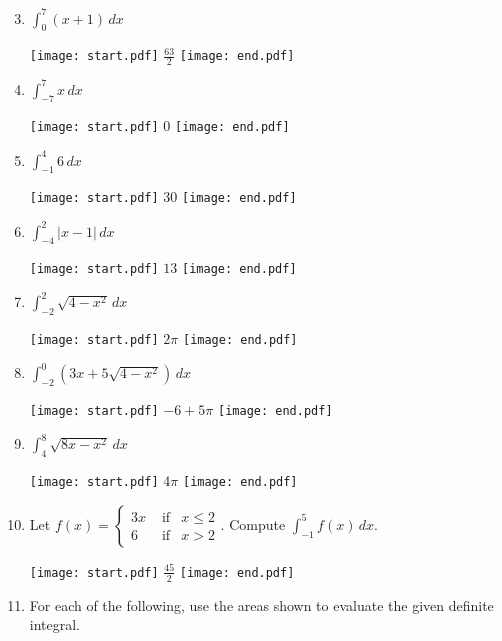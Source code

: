 \documentclass[12pt]{article}
\begin{document}

\begin{enumerate}
\setcounter{enumi}{2}

\item $\int_0^7{(x+1)}\,dx$

\texttt{[image: start.pdf]}
{{$\frac{63}{2}$}}
\texttt{[image: end.pdf]}


\item $\int_{-7}^7{x}\,dx$

\texttt{[image: start.pdf]}
{{$0$}}
\texttt{[image: end.pdf]}


\item $\int_{-1}^4{6}\,dx$

\texttt{[image: start.pdf]}
{{$30$}}
\texttt{[image: end.pdf]}


\item $\int_{-4}^{2}{|x-1|} \,dx$

\texttt{[image: start.pdf]}
{{$13$}}
\texttt{[image: end.pdf]}


\item $\int_{-2}^2{\sqrt{4-x^2}} \,dx$

\texttt{[image: start.pdf]}
{{$2\pi$}}
\texttt{[image: end.pdf]}


\item $\int_{-2}^0{\left(3x+5\sqrt{4-x^2}\right)} \,dx$

\texttt{[image: start.pdf]}
{{$-6+5\pi$}}
\texttt{[image: end.pdf]}


\item $\int_4^8{\sqrt{8x-x^2}} \,dx$

\texttt{[image: start.pdf]}
{{$4\pi$}}
\texttt{[image: end.pdf]}


\item Let $f(x)=\left\{\begin{array}{lll}
3x & \text{ if} & x \leq 2 \\
6 & \text{ if} & x>2
\end{array}\right.$.  Compute $\int_{-1}^5{f(x)} \,dx$.

\texttt{[image: start.pdf]}
{{$\frac{45}{2}$}}
\texttt{[image: end.pdf]}


\item For each of the following, use the areas shown to evaluate the given definite integral.

\begin{center}


\end{center}
\end{enumerate}
\end{document}
